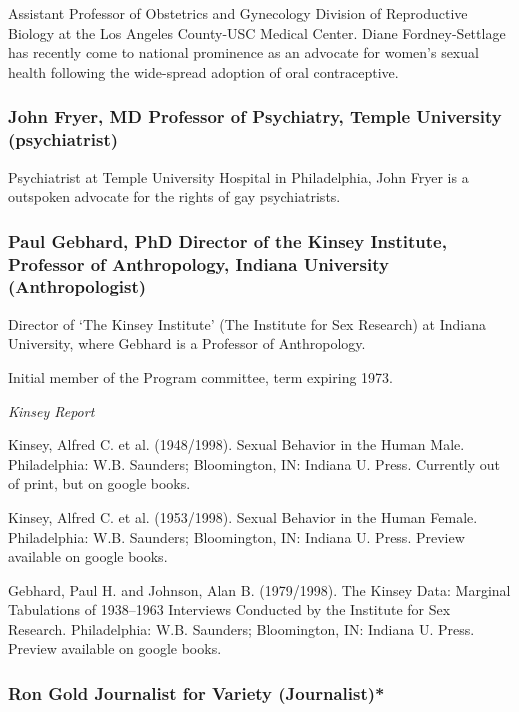 \begin{refsection}
Assistant Professor of Obstetrics and Gynecology Division of Reproductive Biology at the Los Angeles County-USC Medical Center. Diane Fordney-Settlage has recently come to national prominence as an advocate for women's sexual health following the wide-spread adoption of oral contraceptive.

\subsubsection{John Fryer, MD Professor of Psychiatry, Temple University (psychiatrist)}
\label{johnfryermdprofessorofpsychiatrytempleuniversitypsychiatrist}

Psychiatrist at Temple University Hospital in Philadelphia, John Fryer is a outspoken advocate for the rights of gay psychiatrists.

\subsubsection{Paul Gebhard, PhD Director of the Kinsey Institute, Professor of Anthropology, Indiana University (Anthropologist)}
\label{paulgebhardphddirectorofthekinseyinstituteprofessorofanthropologyindianauniversityanthropologist}

Director of `The Kinsey Institute' (The Institute for Sex Research) at Indiana University, where Gebhard is a Professor of Anthropology. 

Initial member of the Program committee, term expiring 1973.

\emph{Kinsey Report}

Kinsey, Alfred C. et al. (1948\slash 1998). Sexual Behavior in the Human Male. Philadelphia: W.B. Saunders; Bloomington, IN: Indiana U. Press. Currently out of print, but on google books.

Kinsey, Alfred C. et al. (1953\slash 1998). Sexual Behavior in the Human Female. Philadelphia: W.B. Saunders; Bloomington, IN: Indiana U. Press. Preview available on google books.

Gebhard, Paul H. and Johnson, Alan B. (1979\slash 1998). The Kinsey Data: Marginal Tabulations of 1938--1963 Interviews Conducted by the Institute for Sex Research. Philadelphia: W.B. Saunders; Bloomington, IN: Indiana U. Press. Preview available on google books.

\subsubsection{Ron Gold Journalist for Variety (Journalist)*}
\label{rongoldjournalistforvarietyjournalist}


\end{refsection}
